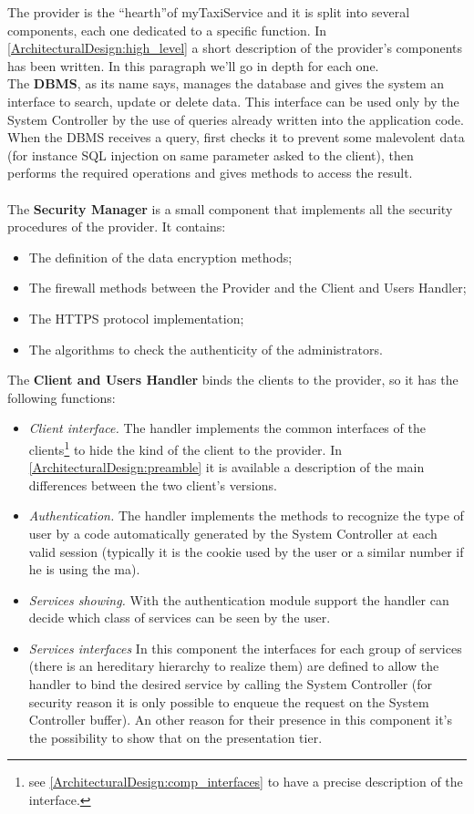 \documentclass[\mainpath/main]{subfiles}
\begin{document}
The provider is the \textquotedblleft hearth\textquotedblright of myTaxiService and it is split into several components, each one dedicated to a specific function. In \autoref{ArchitecturalDesign:high_level} a short description of the provider's components has been written. In this paragraph we'll go in depth for each one.\\
The \textbf{DBMS}, as its name says, manages the database and gives the system an interface to search, update or delete data. This interface can be used only by the System Controller by the use of queries already written into the application code. When the DBMS receives a query, first checks it to prevent some malevolent data (for instance SQL injection on same parameter asked to the client), then performs the required operations and gives methods to access the result.\\
\\
The \textbf{Security Manager} is a small component that implements all the security procedures of the provider. It contains:
\begin{itemize}
	\item The definition of the data encryption methods;
	\item The firewall methods between the Provider and the Client and Users Handler;
	\item The HTTPS protocol implementation;
	\item The algorithms to check the authenticity of the administrators. \\
\end{itemize}

The \textbf{Client and Users Handler} binds the clients to the provider, so it has the following functions:
\begin{itemize}
	\item \textit{Client interface.} The handler implements the common interfaces of the clients\footnote{see \autoref{ArchitecturalDesign:comp_interfaces} to have a precise description of the interface.} to hide the kind of the client to the provider. In \autoref{ArchitecturalDesign:preamble} it is available a description of the main differences between the two client's versions.
	\item \textit{Authentication.} The handler implements the methods to recognize the type of user by a code automatically generated by the System Controller at each valid session (typically it is the cookie used by the user or a similar number if he is using the \gls{ma}).
	\item \textit{Services showing.} With the authentication module support the handler can decide which class of services can be seen by the user.
	\item \textit{Services interfaces} In this component the interfaces for each group of services (there is an hereditary hierarchy to realize them) are defined to allow the handler to bind the desired service by calling the System Controller (for security reason it is only possible to enqueue the request on the System Controller buffer). An other reason for their presence in this component it's the possibility to show that on the presentation tier.\\
\end{itemize}
\end{document}
